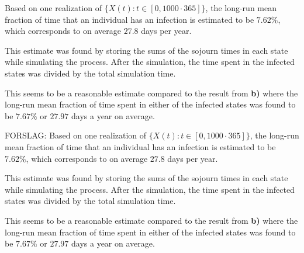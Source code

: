 Based on one realization of $\{X(t): t \in [0,1000\cdot365]\}$, the long-run mean fraction of time that an individual has an infection is estimated to be $7.62\%$, which corresponds to on average $27.8$ days per year. 

This estimate was found by storing the sums of the sojourn times in each state while simulating the process. After the simulation, the time spent in the infected states was divided by the total simulation time. 

This seems to be a reasonable estimate compared to the result from \textbf{b)} where the long-run mean fraction of time spent in either of the infected states was found to be $7.67\%$ or $27.97$ days a year on average.

FORSLAG: Based on one realization of $\{X(t): t \in [0,1000\cdot365]\}$, the long-run mean fraction of time that an individual has an infection is estimated to be $7.62\%$, which corresponds to on average $27.8$ days per year. 

This estimate was found by storing the sums of the sojourn times in each state while simulating the process. After the simulation, the time spent in the infected states was divided by the total simulation time. 

This seems to be a reasonable estimate compared to the result from \textbf{b)} where the long-run mean fraction of time spent in either of the infected states was found to be $7.67\%$ or $27.97$ days a year on average.

